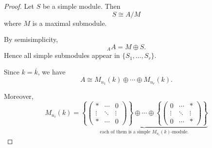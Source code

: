 \begin{proof}
    Let $S$ be a simple module. Then
    \[
        S \cong A/M
    \]
    where $M$ is a maximal submodule.

    By semisimplicity,
    \[
        {}_A A = M \oplus S.
    \]
    Hence all simple submodules appear in $\{S_1,\dots,S_r\}$.

    Since $k=\overline{k}$, we have
    \[
        A \cong M_{n_1}(k)\oplus \cdots \oplus M_{n_r}(k).
    \]

    Moreover,
    \[
        M_{n_i}(k)=
        \underbrace{
            \left\{
            \begin{pmatrix}
                *      & \cdots & 0      \\
                \vdots & \ddots & \vdots \\
                *      & \cdots & 0
            \end{pmatrix}
            \right\}
            \oplus \cdots \oplus
            \left\{
            \begin{pmatrix}
                0      & \cdots & *      \\
                \vdots & \ddots & \vdots \\
                0      & \cdots & *
            \end{pmatrix}
            \right\}
        }_{\text{each of them is a simple } M_{n_i}(k)\text{-module}.}
    \]
\end{proof}

